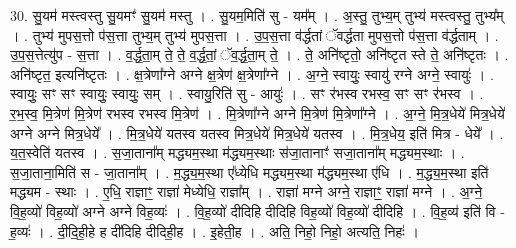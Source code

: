 \documentclass[17pt]{extarticle}
\begin{document}
30. सु॒यम॑ मस्त्वस्तु सु॒यमꣳ॑ सु॒यम॑ मस्तु । . सु॒यम॒मिति॑ सु - यम᳚म् । . अ॒स्तु॒ तुभ्य॒म् तुभ्य॑ मस्त्वस्तु॒ तुभ्य᳚म् । . तुभ्य॑ मुपस॒त्तो प॑स॒त्ता तुभ्य॒म् तुभ्य॑ मुपस॒त्ता । . उ॒प॒स॒त्ता व॑र्द्धतां ॅवर्द्धता मुपस॒त्तो प॑स॒त्ता व॑र्द्धताम् । . उ॒प॒स॒त्तेत्यु॑प - स॒त्ता । . व॒र्द्ध॒ता॒म् ते॒ ते॒ व॒र्द्ध॒तां॒ ॅव॒र्द्ध॒ता॒म् ते॒ । . ते॒ अनि॑ष्टृतो॒ अनि॑ष्टृत स्ते ते॒ अनि॑ष्टृतः । . अनि॑ष्टृत॒ इत्यनि॑ष्टृतः । . क्ष॒त्रेणा᳚ग्ने अग्ने क्ष॒त्रेण॑ क्ष॒त्रेणा᳚ग्ने । . अ॒ग्ने॒ स्वायुः॒ स्वायु॑ रग्ने अग्ने॒ स्वायुः॑ । . स्वायुः॒ सꣳ सꣳ स्वायुः॒ स्वायुः॒ सम् । . स्वायु॒रिति॑ सु - आयुः॑ । . सꣳ र॑भस्व रभस्व॒ सꣳ सꣳ र॑भस्व । . र॒भ॒स्व॒ मि॒त्रेण॑ मि॒त्रेण॑ रभस्व रभस्व मि॒त्रेण॑ । . मि॒त्रेणा᳚ग्ने अग्ने मि॒त्रेण॑ मि॒त्रेणा᳚ग्ने । . अ॒ग्ने॒ मि॒त्र॒धेये॑ मित्र॒धेये॑ अग्ने अग्ने मित्र॒धेये᳚ । . मि॒त्र॒धेये॑ यतस्व यतस्व मित्र॒धेये॑ मित्र॒धेये॑ यतस्व । . मि॒त्र॒धेय॒ इति॑ मित्र - धेये᳚ । . य॒त॒स्वेति॑ यतस्व । . स॒जा॒ताना᳚म् मद्ध्यम॒स्था म॑द्ध्यम॒स्थाः स॑जा॒तानाꣳ॑ सजा॒ताना᳚म् मद्ध्यम॒स्थाः । . स॒जा॒ताना॒मिति॑ स - जा॒ताना᳚म् । . म॒द्ध्य॒म॒स्था ए᳚ध्येधि मद्ध्यम॒स्था म॑द्ध्यम॒स्था ए॑धि । . म॒द्ध्य॒म॒स्था इति॑ मद्ध्यम - स्थाः । . ए॒धि॒ राज्ञाꣳ॒॒ राज्ञा॑ मेध्येधि॒ राज्ञा᳚म् । . राज्ञा॑ मग्ने अग्ने॒ राज्ञाꣳ॒॒ राज्ञा॑ मग्ने । . अ॒ग्ने॒ वि॒ह॒व्यो॑ विह॒व्यो॑ अग्ने अग्ने विह॒व्यः॑ । . वि॒ह॒व्यो॑ दीदिहि दीदिहि विह॒व्यो॑ विह॒व्यो॑ दीदिहि । . वि॒ह॒व्य॑ इति॑ वि - ह॒व्यः॑ । . दी॒दि॒ही॒हे ह दी॑दिहि दीदिही॒ह । . इ॒हेती॒ह । . अति॒ निहो॒ निहो॒ अत्यति॒ निहः॑ । \newline
\end{document}
